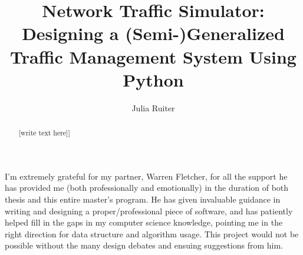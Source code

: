 \documentclass[a4paper,11pt,twoside]{UUthesis}
\title{Network Traffic Simulator:  \\ Designing a (Semi-)Generalized Traffic Management System Using Python}
\author{Julia Ruiter}
\theoremstyle{definition}
\theoremstyle{remark}
\begin{document}

\frontmatter

\maketitle %


\begin{abstract} 
[write text here]]
\end{abstract}

\begin{acknowledgments}
I'm extremely grateful for my partner, Warren Fletcher, for all the support he has provided me (both professionally and emotionally) in the duration of both thesis and this entire master's program. He has given invaluable guidance in writing and designing a proper/professional piece of software, and has patiently helped fill in the gaps in my computer science knowledge, pointing me in the right direction for data structure and algorithm usage.  This project would not be possible without the many design debates and ensuing suggestions from him.
\end{acknowledgments}

\tableofcontents
\listoffigures


\mainmatter




%








\backmatter

%
\nocite{*} %




\end{document}

